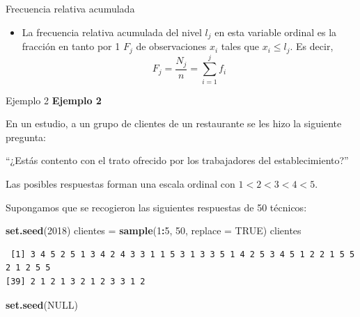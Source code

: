 \documentclass[
  ignorenonframetext,
  aspectratio=169]{beamer}
\newenvironment{Shaded}{\begin{snugshade}}{\end{snugshade}}
\newcommand{\AttributeTok}[1]{\textcolor[rgb]{0.13,0.29,0.53}{#1}}
\newcommand{\ConstantTok}[1]{\textcolor[rgb]{0.56,0.35,0.01}{#1}}
\newcommand{\DecValTok}[1]{\textcolor[rgb]{0.00,0.00,0.81}{#1}}
\newcommand{\FunctionTok}[1]{\textcolor[rgb]{0.13,0.29,0.53}{\textbf{#1}}}
\newcommand{\NormalTok}[1]{#1}
\newcommand{\OtherTok}[1]{\textcolor[rgb]{0.56,0.35,0.01}{#1}}
\newcommand{\SpecialCharTok}[1]{\textcolor[rgb]{0.81,0.36,0.00}{\textbf{#1}}}
\providecommand{\tightlist}{%
  \setlength{\itemsep}{0pt}\setlength{\parskip}{0pt}}
\begin{document}
\begin{frame}{Frecuencia relativa acumulada}
\label{frecuencia-relativa-acumulada-2}
\begin{itemize}
\tightlist
\item
  La frecuencia relativa acumulada del nivel \(l_j\) en esta variable
  ordinal es la fracción en tanto por 1 \(F_j\) de observaciones \(x_i\)
  tales que \(x_i\le l_j\). Es decir,
  \[F_j=\frac{N_j}{n}=\sum_{i=1}^jf_i\]
\end{itemize}
\end{frame}

\begin{frame}[fragile]{Ejemplo 2}
\label{ejemplo-2}
\textbf{Ejemplo 2}

En un estudio, a un grupo de clientes de un restaurante se les hizo la
siguiente pregunta:

``¿Estás contento con el trato ofrecido por los trabajadores del
establecimiento?''

Las posibles respuestas forman una escala ordinal con \(1<2<3<4<5\).

Supongamos que se recogieron las siguientes respuestas de 50 técnicos:

\begin{Shaded}
\begin{Highlighting}[]
\FunctionTok{set.seed}\NormalTok{(}\DecValTok{2018}\NormalTok{)}
\NormalTok{clientes }\OtherTok{=} \FunctionTok{sample}\NormalTok{(}\DecValTok{1}\SpecialCharTok{:}\DecValTok{5}\NormalTok{, }\DecValTok{50}\NormalTok{, }\AttributeTok{replace =} \ConstantTok{TRUE}\NormalTok{)}
\NormalTok{clientes}
\end{Highlighting}
\end{Shaded}

\begin{verbatim}
 [1] 3 4 5 2 5 1 3 4 2 4 3 3 1 1 5 3 1 3 3 5 1 4 2 5 3 4 5 1 2 2 1 5 5 2 1 2 5 5
[39] 2 1 2 1 3 2 1 2 3 3 1 2
\end{verbatim}

\begin{Shaded}
\begin{Highlighting}[]
\FunctionTok{set.seed}\NormalTok{(}\ConstantTok{NULL}\NormalTok{)}
\end{Highlighting}
\end{Shaded}
\end{frame}
\end{document}

